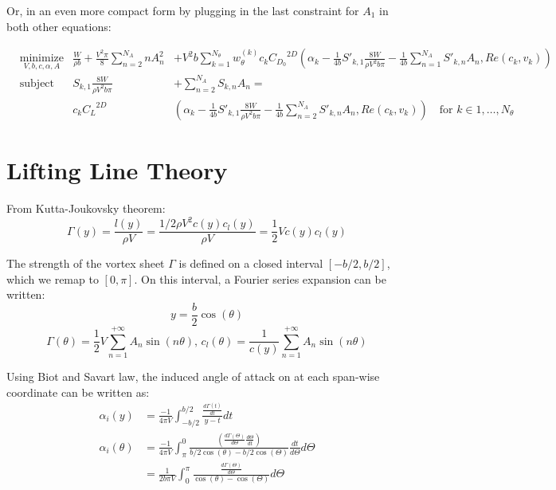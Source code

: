 \documentclass[letterpaper,12pt]{article}
\begin{document}
Or, in an even more compact form by plugging in the last constraint for $A_1$ in both other equations:

\begin{align*}
	& \underset{V, b, c, \alpha, A}{\text{minimize}} &
	\frac{W}{\rho b} + \frac{V^2 \pi}{8}\sum_{n=2}^{N_A} n A_{n}^2 &+
	  V^2 b  \sum_{k=1}^{N_{\theta}} w_{\theta}^{(k)} c_k {C_{D_0}}^{2D}
	  \left( \alpha_k
	  - \frac {1}{4b} S'_{k,1}\frac{8W}{\rho V^2 b \pi}
	  - \frac {1}{4b}\sum_{n=1}^{N_{A}}S'_{k,n}A_n , Re(c_k, v_k)
	  \right)\\
	& \text{subject to} &
 	S_{k, 1} \frac{8W}{\rho V^2 b \pi} &+ \sum_{n=2}^{N_{A}} S_{k,n} A_n = \\
	& & c_k{C_L}^{2D} & \left( \alpha_k
		 - \frac {1}{4b} S'_{k,1}\frac{8W}{\rho V^2 b \pi}
		 - \frac {1}{4b}\sum_{n=2}^{N_{A}}S'_{k,n}A_n , Re(c_k, v_k)\right)
		 \quad \text{for } k \in 1,\dots, N_{\theta}
\end{align*}

\section{Lifting Line Theory}

From Kutta-Joukovsky theorem:
%
$$\Gamma(y) = \frac{l(y)}{\rho V} = \frac{1/2 \rho V^2 c(y) c_l(y)}{\rho V} =  \frac{1}{2} V c(y) c_l(y)$$

The strength of the vortex sheet $\Gamma$ is defined on a closed interval $[-b/2, b/2]$, which we remap to $[0, \pi]$. 
On this interval, a Fourier series expansion can be written:
$$y = \frac{b}{2}\cos(\theta)$$
%
$$\Gamma(\theta) = \frac{1}{2} V\sum_{n=1}^{+\infty} A_n \sin(n\theta) \text{,      } c_l(\theta) = \frac 1 {c(y)} \sum_{n=1}^{+\infty} A_n \sin(n\theta)$$

Using Biot and Savart law, the induced angle of attack on at each span-wise coordinate can be written as:
%
	\begin{align*}
		\alpha_i(y) &= \frac{-1}{4\pi V}\int_{-b/2}^{b/2} \frac{\frac{d\Gamma(t)}{dt}}{y-t} dt \\ 
		\alpha_i(\theta) &= \frac{-1}{4\pi V} \int_{\pi}^{0} \frac{\left( \frac{d\Gamma(\Theta)}{d\Theta} \frac{d\Theta}{dt}\right)}{b/2\cos(\theta)-b/2\cos(\Theta)}\frac{dt}{d\Theta} d\Theta	 \\
				 &= \frac{1}{2b\pi V} \int_{0}^{\pi} \frac{\frac{d\Gamma(\Theta)}{d\Theta}}{\cos(\theta)-\cos(\Theta)} d\Theta	
	\end{align*}
\end{document}
